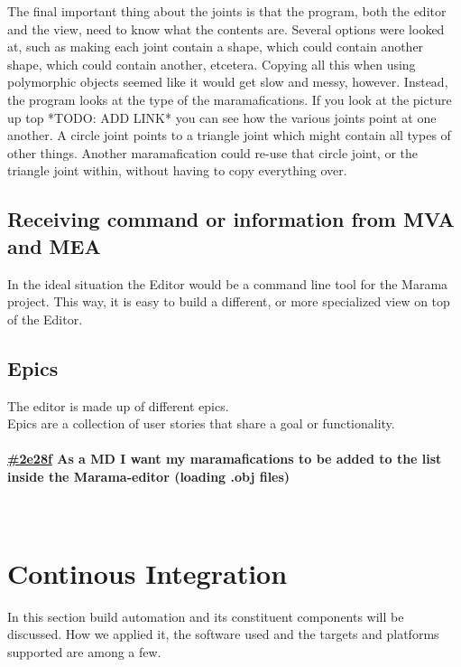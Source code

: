 \documentclass[10pt]{extarticle} %
\newcommand{\myparagraph}[1]{\paragraph{#1}\mbox{}\\} %
\begin{document}
    The final important thing about the joints is that the program, both the editor and the view, need to know what the contents are.
    Several options were looked at, such as making each joint contain a shape, which could contain another shape, which could contain another, etcetera.
    Copying all this when using polymorphic objects seemed like it would get slow and messy, however.
    Instead, the program looks at the type of the maramafications.
    If you look at the picture up top *TODO: ADD LINK* you can see how the various joints point at one another.
    A circle joint points to a triangle joint which might contain all types of other things.
    Another maramafication could re-use that circle joint, or the triangle joint within, without having to copy everything over.

    \subsection[Communication MVA-MEA]{Receiving command or information from MVA and MEA}
    \label{subsec:comchoice}
    In the ideal situation the Editor would be a command line tool for the Marama project.
    This way, it is easy to build a different, or more specialized view on top of the Editor.

    \subsection{Epics}
    \label{subsec:epics}
    The editor is made up of different epics.\\
    Epics are a collection of user stories that share a goal or functionality.

    \newcommand{\clickup}[1]{https://app.clickup.com/757520/761304/t/#1}

    \myparagraph{\href{\clickup{2e28f}}{\#2e28f} As a MD I want my maramafications to be added to the list inside the Marama-editor (loading .obj files)}

    \newpage
    \section{Continous Integration}
    In this section build automation and its constituent components will be discussed.
    How we applied it, the software used and the targets and platforms supported are among a few.
\end{document}
